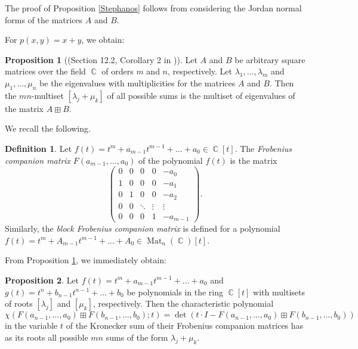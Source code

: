 \documentclass[14pt, dvipsnames]{extarticle}
\theoremstyle{definition}
\newtheorem{prop}{Proposition}
\theoremstyle{definition}
\newtheorem{defi}{Definition}
\theoremstyle{remark}
\DeclareMathOperator{\Cc}{\mathbb{C}}
\DeclareMathOperator{\Mat}{\mathrm{Mat}}
\begin{document}
The proof of Proposition \ref{Stephanos} follows from considering the Jordan normal forms of the matrices $A$ and $B$.

For $p(x, y) = x + y$, we obtain:

\begin{prop}[(Section 12.2, Corollary 2 in \cite{Lancaster})]\label{eigen_sum}
Let $A$ and $B$ be arbitrary square matrices over the field $\Cc$ of orders $m$ and $n$, respectively. Let $\lambda_1, \dots, \lambda_m$ and $\mu_1, \dots, \mu_n$ be the eigenvalues with multiplicities for the matrices $A$ and $B$. Then the $mn$-multiset $[\lambda_j + \mu_k]$ of all possible sums is the multiset of eigenvalues of the matrix $A\boxplus B$.  
\end{prop}

We recall the following.

\begin{defi}\label{companion_matrix}
Let $f(t) = t^m + a_{m-1}t^{m-1} + \dots + a_0\in \Cc[t]$. The {\it Frobenius companion matrix} $F(a_{m-1}, ..., a_0)$ of the polynomial $f(t)$ is the matrix
\begin{equation}\label{Frobenius_matrix}
\left(\begin{array}{ccccc}
0 & 0 & 0 & 0 & -a_{0}\\
1 & 0 & 0 & 0 & -a_{1}\\
0 & 1 & 0 & 0 & -a_{2}\\
0 & 0 & \ddots & \vdots & \vdots\\
0 & 0 & 0 & 1 & -a_{m-1}
\end{array}\right).
\end{equation}
Similarly, the {\it block Frobenius companion matrix} is defined for a polynomial $f(t) = t^m + A_{m-1}t^{m-1} + \dots + A_0\in \Mat_{n}(\Cc)[t]$.
\end{defi}

From Proposition \ref{eigen_sum}, we immediately obtain:

\begin{prop}\label{coroll1}
Let $f(t) = t^m + a_{m-1}t^{m-1} + \dots + a_0$ and $g(t) = t^n + b_{n-1}t^{n-1} + \dots + b_0$ be polynomials in the ring $\Cc[t]$ with multisets of roots $[\lambda_j]$ and $[\mu_k]$, respectively. Then the characteristic polynomial
$$\chi(F(a_{n-1}, \dots, a_0)\boxplus F(b_{n-1}, \dots, b_0); t) = \det(t\cdot I - F(a_{n-1}, \dots, a_0)\boxplus F(b_{n-1}, \dots, b_0))$$
in the variable $t$ of the Kronecker sum of their Frobenius companion matrices has as its roots all possible $mn$ sums of the form $\lambda_j + \mu_k$.
\end{prop}
\end{document}
